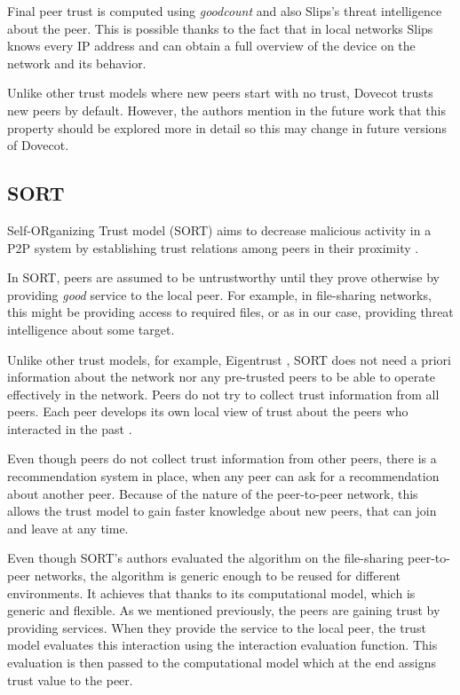 Final peer trust is computed using \textit{goodcount} and also Slips's threat intelligence about the peer. 
This is possible thanks to the fact that in local networks Slips knows every IP address and can obtain a full overview of the device on the network and its behavior.

Unlike other trust models where new peers start with no trust, Dovecot trusts new peers by default. 
However, the authors mention in the future work that this property should be explored more in detail so this may change in future versions of Dovecot.

\subsection{SORT}
\label{subsec:sort}
Self-ORganizing Trust model (SORT) aims to decrease malicious activity in a P2P system by establishing trust relations among peers in their proximity \cite{sort}.

In SORT, peers are assumed to be untrustworthy until they prove otherwise by providing \textit{good} service to the local peer. 
For example, in file-sharing networks, this might be providing access to required files, or as in our case, providing threat intelligence about some target.

Unlike other trust models, for example, Eigentrust \cite{kamvar2003eigentrust}, SORT does not need a priori information about the network nor any pre-trusted peers to be able to operate effectively in the network.
Peers do not try to collect trust information from all peers.
Each peer develops its own local view of trust about the peers who interacted in the past \cite{sort}.

Even though peers do not collect trust information from other peers, there is a recommendation system in place, when any peer can ask for a recommendation about another peer.
Because of the nature of the peer-to-peer network, this allows the trust model to gain faster knowledge about new peers, that can join and leave at any time.

Even though SORT's authors evaluated the algorithm on the file-sharing peer-to-peer networks, the algorithm is generic enough to be reused for different environments.
It achieves that thanks to its computational model, which is generic and flexible.
As we mentioned previously, the peers are gaining trust by providing services. 
When they provide the service to the local peer, the trust model evaluates this interaction using the interaction evaluation function.
This evaluation is then passed to the computational model which at the end assigns trust value to the peer.

